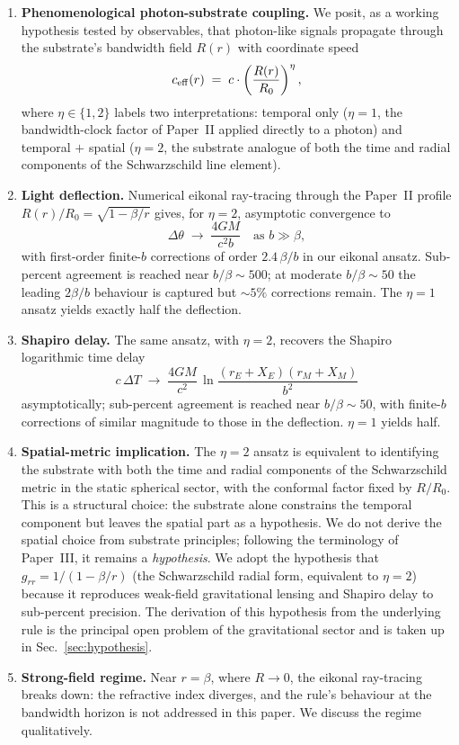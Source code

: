 \documentclass[11pt,a4paper]{article}
\begin{document}
\begin{enumerate}
\item \textbf{Phenomenological photon-substrate coupling.}
We posit, as a working hypothesis tested by observables, that
photon-like signals propagate through the substrate's bandwidth
field $R(r)$ with coordinate speed
\begin{equation}
c_{\rm eff}(r) \;=\; c \cdot \left(\frac{R(r)}{R_0}\right)^\eta,
\label{eq:photon_ansatz}
\end{equation}
where $\eta \in \{1, 2\}$ labels two interpretations: temporal
only ($\eta = 1$, the bandwidth-clock factor of Paper~II
applied directly to a photon) and temporal $+$ spatial
($\eta = 2$, the substrate analogue of both the time and
radial components of the Schwarzschild line element).

\item \textbf{Light deflection.} Numerical eikonal ray-tracing
through the Paper~II profile $R(r)/R_0 = \sqrt{1 - \beta/r}$
gives, for $\eta = 2$, asymptotic convergence to
\[
\Delta\theta \;\to\; \frac{4GM}{c^2 b}
\quad
\text{as } b \gg \beta,
\]
with first-order finite-$b$ corrections of order $2.4\,\beta/b$
in our eikonal ansatz. Sub-percent agreement is reached near
$b/\beta \sim 500$; at moderate $b/\beta \sim 50$ the leading
$2\beta/b$ behaviour is captured but $\sim 5\%$ corrections
remain. The $\eta = 1$ ansatz yields exactly half the
deflection.

\item \textbf{Shapiro delay.} The same ansatz, with $\eta = 2$,
recovers the Shapiro logarithmic time delay
\[
c\,\Delta T \;\to\; \frac{4GM}{c^2}\,
\ln\frac{(r_E + X_E)(r_M + X_M)}{b^2}
\]
asymptotically; sub-percent agreement is reached near
$b/\beta \sim 50$, with finite-$b$ corrections of similar
magnitude to those in the deflection. $\eta = 1$ yields half.

\item \textbf{Spatial-metric implication.} The $\eta = 2$
ansatz is equivalent to identifying the substrate with both the
time and radial components of the Schwarzschild metric in the
static spherical sector, with the conformal factor fixed by
$R/R_0$. This is a structural choice: the substrate alone
constrains the temporal component but leaves the spatial part as
a hypothesis. We do not derive the spatial choice from substrate
principles; following the terminology of Paper~III, it remains
a \emph{hypothesis}. We adopt the hypothesis that
$g_{rr} = 1/(1-\beta/r)$ (the Schwarzschild radial form,
equivalent to $\eta = 2$) because it reproduces weak-field
gravitational lensing and Shapiro delay to sub-percent
precision. The derivation of this hypothesis from the underlying
rule is the principal open problem of the gravitational sector
and is taken up in Sec.~\ref{sec:hypothesis}.

\item \textbf{Strong-field regime.} Near $r = \beta$, where
$R \to 0$, the eikonal ray-tracing breaks down: the refractive
index diverges, and the rule's behaviour at the bandwidth horizon
is not addressed in this paper. We discuss the regime
qualitatively.
\end{enumerate}
\end{document}

